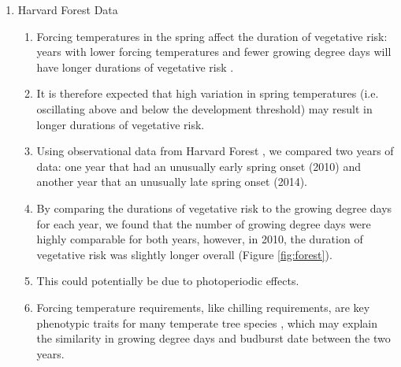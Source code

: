 \documentclass{article}\usepackage[]{graphicx}\usepackage[]{color}
\begin{document}
\begin{enumerate}
\item Harvard Forest Data
\begin{enumerate}
\item Forcing temperatures in the spring affect the duration of vegetative risk: years with lower forcing temperatures and fewer growing degree days will have longer durations of vegetative risk \citep{Donnelly2017}.
\item It is therefore expected that high variation in spring temperatures (i.e. oscillating above and below the development threshold) may result in longer durations of vegetative risk.
\item Using observational data from Harvard Forest \citep{Okeefe2014}, we compared two years of data: one year that had an unusually early spring onset (2010) and another year that an unusually late spring onset (2014).
\item By comparing the durations of vegetative risk to the growing degree days for each year, we found that the number of growing degree days were highly comparable for both years, however, in 2010, the duration of vegetative risk was slightly longer overall (Figure \ref{fig:forest}). 
\item This could potentially be due to photoperiodic effects.
\item Forcing temperature requirements, like chilling requirements, are key phenotypic traits for many temperate tree species \citep{Kramer2017}, which may explain the similarity in growing degree days and budburst date between the two years. 
\end{enumerate}
\end {enumerate}
\end{document}
